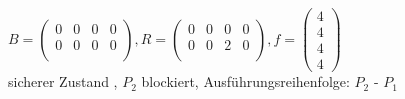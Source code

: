 \documentclass[12pt]{amsart}
\begin{document}
$ B =
\begin{pmatrix}
0 & 0 & 0 & 0 \\ %
0 & 0 & 0 & 0 \\ %
\end{pmatrix},
R =
\begin{pmatrix}
0 & 0 & 0 & 0 \\
0 & 0 & 2 & 0 \\
\end{pmatrix},
f =
\begin{pmatrix}
4 \\ %
4 \\ %
4 \\ %
4    %
\end{pmatrix} $ \\
sicherer Zustand
, $P_2$ blockiert,
Ausführungsreihenfolge: $P_2$ - $P_1$
\end{document}
